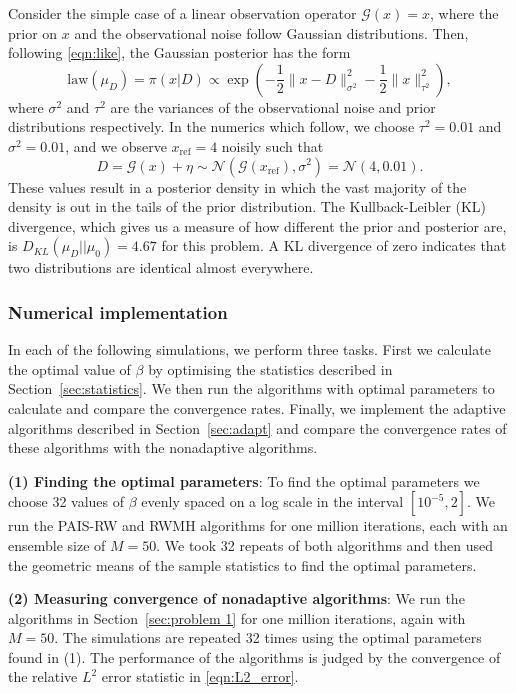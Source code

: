 \documentclass[final]{siamltex}
\newcommand{\G}{\mathcal{G}}
\begin{document}
Consider the simple case of a linear observation operator $\G(x) = x$, where the prior on $x$ and the observational noise follow Gaussian distributions. Then, following \eqref{eqn:like}, the Gaussian posterior has the form
\begin{equation}\label{eqn:Gaussian posterior}
	\text{law}(\mu_D) = \pi(x|D) \propto \exp\left(-\frac{1}{2}\big\|x - D\big\|^2_{\sigma^2} - \frac{1}{2}\big\|x\big\|^2_{\tau^2}\right),
\end{equation}
where $\sigma^2$ and $\tau^2$ are the variances of the
observational noise and prior distributions respectively. In the
numerics which follow, we choose $\tau^2 =0.01$ and $\sigma^2 = 0.01$, and
we observe $x_\text{ref}=4$ noisily such that
\[
D = \mathcal{G}(x) + \eta \sim \mathcal{N}(\mathcal{G}(x_\text{ref}),\sigma^2) = \mathcal{N}(4,0.01).
\]
These values result in a posterior density in which the vast majority
of the density is out in the tails of the
prior distribution. The Kullback-Leibler (KL)
divergence, which gives us a measure of how different the prior and
posterior are, is $D_{KL}(\mu_D || \mu_0) = 4.67$ for this
problem. A KL divergence of zero indicates that two distributions are
identical almost everywhere.

\subsubsection{Numerical implementation}\label{sec:Implementation P1}

In each of the following simulations, we perform three tasks. First we calculate the optimal value of $\beta$ by optimising the statistics described in Section~\ref{sec:statistics}. We then run the algorithms with optimal parameters to calculate and compare the convergence rates. Finally, we implement the adaptive algorithms described in Section~\ref{sec:adapt} and compare the convergence rates of these algorithms with the nonadaptive algorithms.

{\bf (1) Finding the optimal parameters}: To find the optimal
parameters we choose 32 values of $\beta$ evenly spaced on a log scale
in the interval $[10^{-5}, 2]$. We run the PAIS-RW and RWMH algorithms
for one million iterations, each with an ensemble size of $M=50$. We took
32 repeats of both algorithms and then used the geometric means of the
sample statistics to find the optimal parameters.

{\bf (2) Measuring convergence of nonadaptive algorithms}: We run the algorithms in Section~\ref{sec:problem 1} for one million iterations, again with $M=50$. The simulations are repeated 32 times using the optimal parameters found in (1). The performance of the algorithms is judged by the convergence of the relative $L^2$ error statistic in \eqref{eqn:L2_error}.
\end{document}
